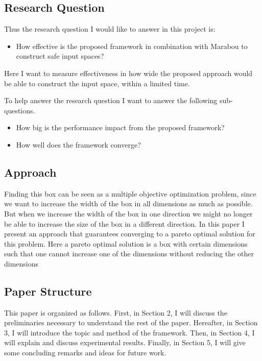 \documentclass[../main.tex]{subfiles}
\begin{document}
\subsection*{Research Question}
Thus the research question I would like to answer in this project is:
\begin{itemize}
    \item How effective is the proposed framework in combination with Marabou to construct safe input spaces?
\end{itemize}
Here I want to measure effectiveness in how wide the proposed approach would be able to construct the input space, within a limited time.

To help answer the research question I want to answer the following sub-questions.
\begin{itemize}
    \item How big is the performance impact from the proposed framework?
    \item How well does the framework converge?
\end{itemize}

\subsection*{Approach}
Finding this box can be seen as a multiple objective optimization problem, since we want to increase the width of the box in all dimensions as much as  possible. But when we increase the width of the box in one direction we might no longer be able to increase the size of the box in a different direction. In this paper I present an approach that guarantees converging to a pareto optimal solution for this problem. Here a pareto optimal solution is a box with certain dimensions such that one cannot increase one of the dimensions without reducing the other dimensions

\subsection*{Paper Structure}
This paper is organized as follows. First, in Section 2, I will discuss the preliminaries necessary to understand the rest of the paper. Hereafter, in Section 3, I will introduce the topic and method of the framework. Then, in Section 4, I will explain and discuss experimental results. Finally, in Section 5, I will give some concluding remarks and ideas for future work.
\end{document}
